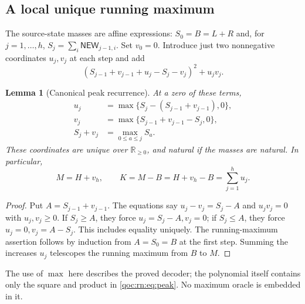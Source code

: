 \documentclass[11pt,letterpaper]{article}
\newtheorem{lemma}[theorem]{Lemma}
\theoremstyle{definition}
\theoremstyle{remark}
\newcommand{\Rp}{\mathbb R_{\geq0}}
\newcommand{\NEW}{\mathsf{NEW}}
\begin{document}
\subsection{A local unique running maximum}
The source-state masses are affine expressions: $S_0=B=L+R$ and, for $j=1,\ldots,h$, $S_j=\sum_i\NEW_{j-1,i}$. Set $v_0=0$. Introduce just two nonnegative coordinates $u_j,v_j$ at each step and add
\begin{equation}
 \left(S_{j-1}+v_{j-1}+u_j-S_j-v_j\right)^2+u_jv_j.
 \label{qoc:rn:eq:peak}
\end{equation}
\begin{lemma}[Canonical peak recurrence]
At a zero of these terms,
\begin{align*}
 u_j&=\max\{S_j-(S_{j-1}+v_{j-1}),0\},\\
 v_j&=\max\{S_{j-1}+v_{j-1}-S_j,0\},\\
 S_j+v_j&=\max_{0\leq a\leq j}S_a.
\end{align*}
These coordinates are unique over $\Rp$, and natural if the masses are natural. In particular,
\[
 M=H+v_h,\qquad K=M-B=H+v_h-B=\sum_{j=1}^h u_j.
\]
\end{lemma}
\begin{proof}
Put $A=S_{j-1}+v_{j-1}$. The equations say $u_j-v_j=S_j-A$ and $u_jv_j=0$ with $u_j,v_j\geq0$. If $S_j\geq A$, they force $u_j=S_j-A,v_j=0$; if $S_j\leq A$, they force $u_j=0,v_j=A-S_j$. This includes equality uniquely. The running-maximum assertion follows by induction from $A=S_0=B$ at the first step. Summing the increases $u_j$ telescopes the running maximum from $B$ to $M$.
\end{proof}
The use of $\max$ here describes the proved decoder; the polynomial itself contains only the square and product in \eqref{qoc:rn:eq:peak}. No maximum oracle is embedded in it.
\end{document}
